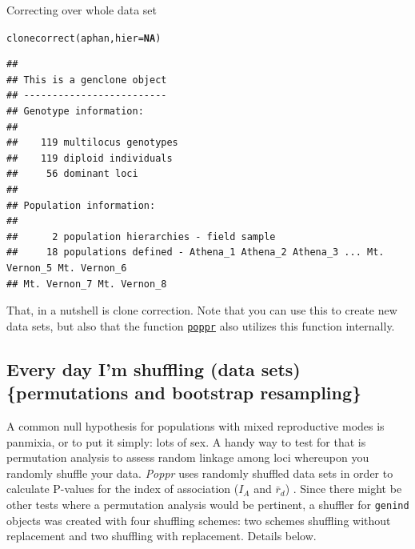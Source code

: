 \documentclass[letterpaper]{article}\usepackage[]{graphicx}\usepackage[]{color}
\makeatletter
\newcommand{\hlnum}[1]{\textcolor[rgb]{0.502,0,0.502}{\textbf{#1}}}%
\newcommand{\hlstd}[1]{\textcolor[rgb]{0,0,0}{#1}}%
\newcommand{\hlkwc}[1]{\textcolor[rgb]{0,0.502,0.753}{#1}}%
\newcommand{\hlkwd}[1]{\textcolor[rgb]{0,0.267,0.4}{#1}}%
\newenvironment{kframe}{%
 \def\at@end@of@kframe{}%
 \ifinner\ifhmode%
  \def\at@end@of@kframe{\end{minipage}}%
  \begin{minipage}{\columnwidth}%
 \fi\fi%
 \def\FrameCommand##1{\hskip\@totalleftmargin \hskip-\fboxsep
 \colorbox{shadecolor}{##1}\hskip-\fboxsep
     \hskip-\linewidth \hskip-\@totalleftmargin \hskip\columnwidth}%
 \MakeFramed {\advance\hsize-\width
   \@totalleftmargin\z@ \linewidth\hsize
   \@setminipage}}%
 {\par\unskip\endMakeFramed%
 \at@end@of@kframe}
\newenvironment{knitrout}{}{} %
\newcommand{\tab}{\hspace*{1em}}
\newcommand{\cmdlink}[2]{
  \texttt{\hyperref[#1]{#2}}
}
\newcommand{\Poppr}{\textit{Poppr}}
\makeatother
\begin{document}
Correcting over whole data set
\begin{knitrout}\footnotesize
{}\color{fgcolor}\begin{kframe}
\begin{alltt}
\hlkwd{clonecorrect}\hlstd{(aphan,} \hlkwc{hier} \hlstd{=} \hlnum{NA}\hlstd{)}
\end{alltt}
\begin{verbatim}
## 
## This is a genclone object
## -------------------------
## Genotype information:
## 
##    119 multilocus genotypes
##    119 diploid individuals
##     56 dominant loci
## 
## Population information:
## 
##      2 population hierarchies - field sample
##     18 populations defined - Athena_1 Athena_2 Athena_3 ... Mt. Vernon_5 Mt. Vernon_6 
## Mt. Vernon_7 Mt. Vernon_8
\end{verbatim}
\end{kframe}
\end{knitrout}

\noindent
That, in a nutshell is clone correction. Note that you can use this to create 
new data sets, but also that the function\cmdlink{summary:poppr}{poppr}also
utilizes this function internally. 

%
\subsection{Every day I'm shuffling (data sets)  \{permutations and bootstrap resampling\}}
\label{data.manip:shuffle}

\tab\tab A common null hypothesis for populations with mixed reproductive modes is panmixia, or to put it simply: lots of sex. A handy way to test for that is permutation analysis to assess random linkage among loci whereupon you randomly shuffle your data. \Poppr{} uses randomly shuffled data sets in order to calculate P-values for the index of association ($I_A$ and $\bar r_d$) \cite{Agapow:2001}. Since there might be other tests where a permutation analysis would be pertinent, a shuffler for \texttt{genind} objects was created with four shuffling schemes: two schemes shuffling without replacement and two shuffling with replacement. Details below.
\end{document}
